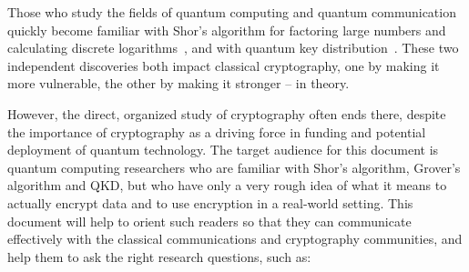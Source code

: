 



Those who study the fields of quantum computing and quantum
communication quickly become familiar with Shor's algorithm for
factoring large numbers and calculating discrete
logarithms~\cite{shor:siam-factor}, and with quantum key
distribution~\cite{bennett:bb84,PhysRevLett.68.557,ekert1991qcb,PhysRevLett.108.130503,xu2015measurement,Vazirani:2019:FDI:3321370.3310974,RevModPhys.81.1301,PhysRevLett.85.441}.
These two independent discoveries both impact classical cryptography,
one by making it more vulnerable, the other by making it stronger --
in theory.

However, the direct, organized study of cryptography often ends there,
despite the importance of cryptography as a driving force in funding
and potential deployment of quantum technology.  The target audience
for this document is quantum computing researchers who are familiar
with Shor's algorithm, Grover's algorithm and QKD, but who have only a
very rough idea of what it means to actually encrypt data and to use
encryption in a real-world setting.  This document will help to orient
such readers so that they can communicate effectively with the
classical communications and cryptography communities, and help them
to ask the right research questions, such as:

